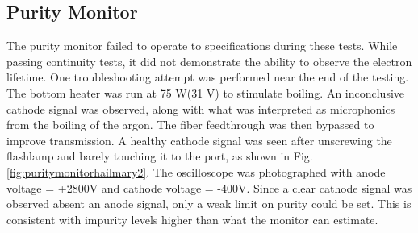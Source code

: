 \subsection{Purity Monitor}
The purity monitor failed to operate to specifications during these tests.
While passing continuity tests, it did not demonstrate the ability to observe the electron lifetime.
One troubleshooting attempt was performed near the end of the testing.
The bottom heater was run at 75 W(31 V) to stimulate boiling.
An inconclusive cathode signal was observed, along with what was interpreted as microphonics from the boiling of the argon.
The fiber feedthrough was then bypassed to improve transmission.
A healthy cathode signal was seen after unscrewing the flashlamp and barely touching it to the port, as shown in Fig. \ref{fig:puritymonitorhailmary2}.
The oscilloscope was photographed with  anode voltage = +2800V and cathode voltage = -400V.
Since a clear cathode signal was observed absent an anode signal, only a weak limit on purity could be set.
This is consistent with impurity levels higher than what the monitor can estimate.










     
